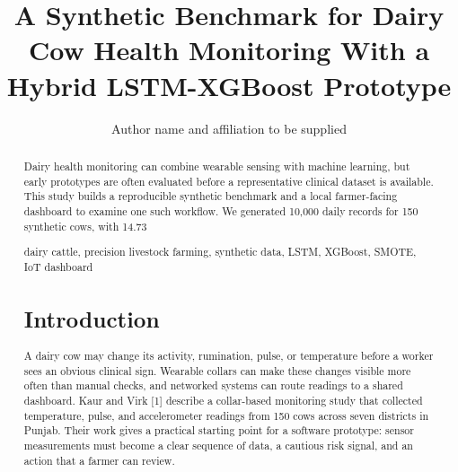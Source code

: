 \documentclass[journal]{IEEEtran}
\title{A Synthetic Benchmark for Dairy Cow Health Monitoring With a Hybrid LSTM-XGBoost Prototype}
\author{Author name and affiliation to be supplied}
\begin{document}
\maketitle

\begin{abstract}Dairy health monitoring can combine wearable sensing with machine learning, but early prototypes are often evaluated before a representative clinical dataset is available. This study builds a reproducible synthetic benchmark and a local farmer-facing dashboard to examine one such workflow. We generated 10,000 daily records for 150 synthetic cows, with 14.73%

\begin{IEEEkeywords}dairy cattle, precision livestock farming, synthetic data, LSTM, XGBoost, SMOTE, IoT dashboard\end{IEEEkeywords}

\section{Introduction}

A dairy cow may change its activity, rumination, pulse, or temperature before a worker sees an obvious clinical sign. Wearable collars can make these changes visible more often than manual checks, and networked systems can route readings to a shared dashboard. Kaur and Virk [1] describe a collar-based monitoring study that collected temperature, pulse, and accelerometer readings from 150 cows across seven districts in Punjab. Their work gives a practical starting point for a software prototype: sensor measurements must become a clear sequence of data, a cautious risk signal, and an action that a farmer can review.


\end{abstract}
\end{document}
